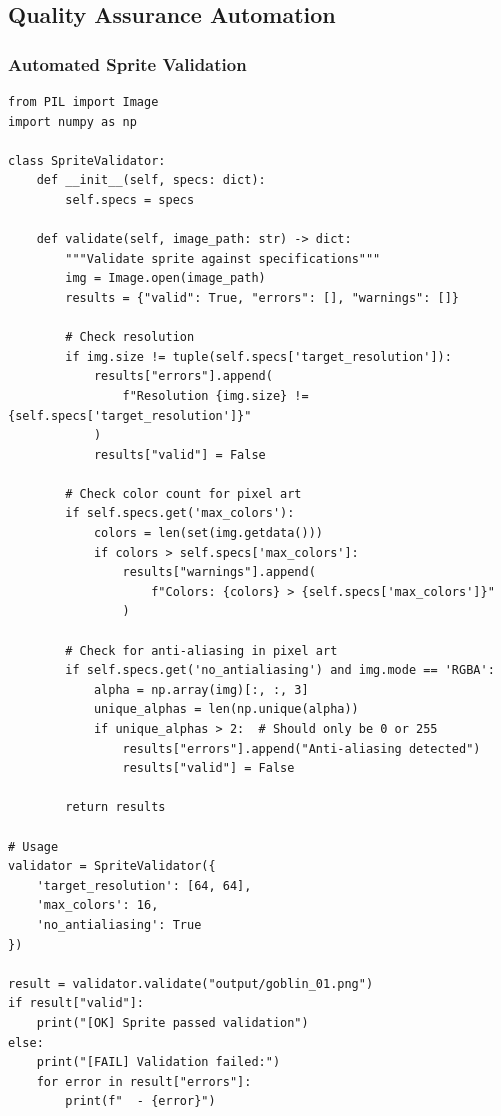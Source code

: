 \documentclass[11pt]{article}
\begin{document}
\subsection{Quality Assurance Automation}

\subsubsection{Automated Sprite Validation}

\begin{verbatim}
from PIL import Image
import numpy as np

class SpriteValidator:
    def __init__(self, specs: dict):
        self.specs = specs

    def validate(self, image_path: str) -> dict:
        """Validate sprite against specifications"""
        img = Image.open(image_path)
        results = {"valid": True, "errors": [], "warnings": []}

        # Check resolution
        if img.size != tuple(self.specs['target_resolution']):
            results["errors"].append(
                f"Resolution {img.size} != {self.specs['target_resolution']}"
            )
            results["valid"] = False

        # Check color count for pixel art
        if self.specs.get('max_colors'):
            colors = len(set(img.getdata()))
            if colors > self.specs['max_colors']:
                results["warnings"].append(
                    f"Colors: {colors} > {self.specs['max_colors']}"
                )

        # Check for anti-aliasing in pixel art
        if self.specs.get('no_antialiasing') and img.mode == 'RGBA':
            alpha = np.array(img)[:, :, 3]
            unique_alphas = len(np.unique(alpha))
            if unique_alphas > 2:  # Should only be 0 or 255
                results["errors"].append("Anti-aliasing detected")
                results["valid"] = False

        return results

# Usage
validator = SpriteValidator({
    'target_resolution': [64, 64],
    'max_colors': 16,
    'no_antialiasing': True
})

result = validator.validate("output/goblin_01.png")
if result["valid"]:
    print("[OK] Sprite passed validation")
else:
    print("[FAIL] Validation failed:")
    for error in result["errors"]:
        print(f"  - {error}")
\end{verbatim}
\end{document}
